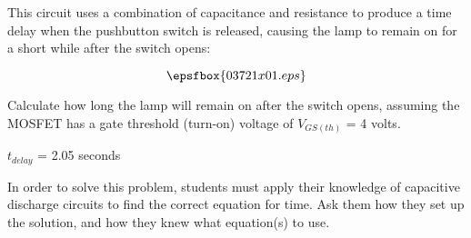 

This circuit uses a combination of capacitance and resistance to produce a time delay when the pushbutton switch is released, causing the lamp to remain on for a short while after the switch opens:

$$\epsfbox{03721x01.eps}$$

Calculate how long the lamp will remain on after the switch opens, assuming the MOSFET has a gate threshold (turn-on) voltage of $V_{GS(th)}$ = 4 volts.







$t_{delay}$ = 2.05 seconds







In order to solve this problem, students must apply their knowledge of capacitive discharge circuits to find the correct equation for time.  Ask them how they set up the solution, and how they knew what equation(s) to use.




